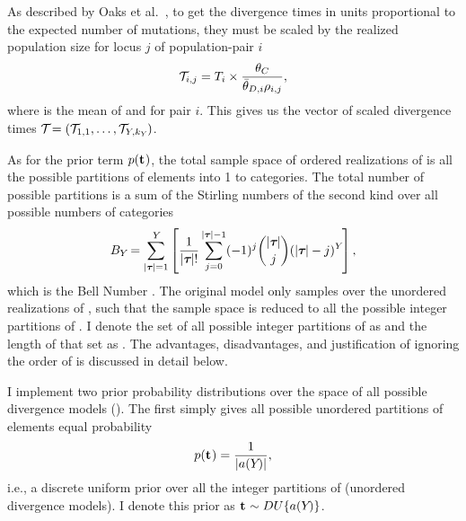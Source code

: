 \begin{linenomath}
As described by Oaks et al.\ \cite{Oaks2012}, to get the divergence times in
units proportional to the expected number of mutations, they must be scaled by
the realized population size for locus $j$ of population-pair $i$ 
\begin{equation}
    \divTimeScaled{i}{j} = \divTimeMap{i} \times \frac{\myTheta{C}}{
        \descendantThetaMean{i} \ploidyScalar{i}{j}},
    \label{eq:divTimeScaled}
\end{equation}
where  is the mean of  and
 for pair $i$.
This gives us the vector of scaled divergence times
$\divTimeScaledVector = (\divTimeScaled{1}{1}, \ldots,
\divTimeScaled{\npairs{}}{\nloci{\npairs{}}})$.
\end{linenomath}


\begin{linenomath}
As for the prior term $p(\mathbf{t_{}})$, the total sample space of
ordered realizations of \divTimeIndexVector is all the possible partitions of
\npairs{} elements into 1 to \npairs{} categories.
The total number of possible partitions is a sum of the Stirling numbers of
the second kind over all possible numbers of categories \divTimeNum
\begin{equation}
    B_{Y_{}}=\sum_{\lvert \boldsymbol{\tau_{}} \rvert=1}^{Y_{}} \left[
    \frac{1}{\lvert \boldsymbol{\tau_{}} \rvert!} \sum_{j=0}^{\lvert \boldsymbol{\tau_{}} \rvert-1} (-1)^{j}
    \binom{\lvert \boldsymbol{\tau_{}} \rvert}{j} (\lvert \boldsymbol{\tau_{}} \rvert-j)^{Y_{}} \right],
    \label{eq:bell}
\end{equation}
which is the Bell Number \cite{Bell1934}.
The original \msb model only samples over the unordered realizations of
\divTimeIndexVector, such that the sample space is reduced to all the possible
integer partitions of \npairs{} \cite{Oaks2012,Huang2011,OeisPartitionNumber,
    OeisPartitionTriangle,Malenfant2011}.
I denote the set of all possible integer partitions of \npairs{} as
\integerPartitionSet{\npairs{}} and the length of that set as
\integerPartitionNum{\npairs{}}.
The advantages, disadvantages, and justification of ignoring the order
of \divTimeIndexVector is discussed in detail below.
\end{linenomath}

\begin{linenomath}
I implement two prior probability distributions over the space
of all possible divergence models (\divTimeIndexVector).
The first simply gives all possible unordered partitions of \npairs{} elements
equal probability
\begin{equation}
    p(\mathbf{t_{}}) = \frac{1}{\lvert a({Y_{}}) \rvert},
    \label{eq:divModelPriorUniform}
\end{equation}
i.e., a discrete uniform prior over all the integer partitions of \npairs{}
(unordered divergence models).
I denote this prior as
$\mathbf{t_{}} \sim DU\{a({Y_{}})\}$.
\end{linenomath}

